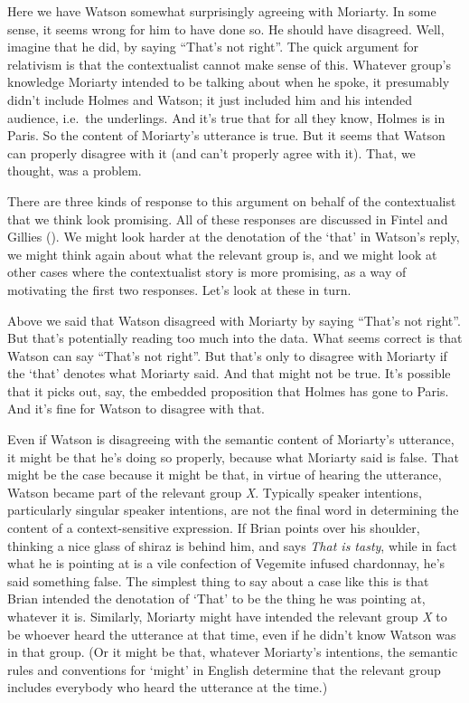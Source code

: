 \documentclass[
  11pt,
  letterpaper,
  DIV=11,
  numbers=noendperiod,
  twoside]{scrartcl}
\begin{document}
Here we have Watson somewhat surprisingly agreeing with Moriarty. In
some sense, it seems wrong for him to have done so. He should have
disagreed. Well, imagine that he did, by saying ``That's not right''.
The quick argument for relativism is that the contextualist cannot make
sense of this. Whatever group's knowledge Moriarty intended to be
talking about when he spoke, it presumably didn't include Holmes and
Watson; it just included him and his intended audience, i.e.~the
underlings. And it's true that for all they know, Holmes is in Paris. So
the content of Moriarty's utterance is true. But it seems that Watson
can properly disagree with it (and can't properly agree with it). That,
we thought, was a problem.

There are three kinds of response to this argument on behalf of the
contextualist that we think look promising. All of these responses are
discussed in Fintel and Gillies (). We
might look harder at the denotation of the `that' in Watson's reply, we
might think again about what the relevant group is, and we might look at
other cases where the contextualist story is more promising, as a way of
motivating the first two responses. Let's look at these in turn.

Above we said that Watson disagreed with Moriarty by saying ``That's not
right''. But that's potentially reading too much into the data. What
seems correct is that Watson can say ``That's not right''. But that's
only to disagree with Moriarty if the `that' denotes what Moriarty said.
And that might not be true. It's possible that it picks out, say, the
embedded proposition that Holmes has gone to Paris. And it's fine for
Watson to disagree with that.

Even if Watson is disagreeing with the semantic content of Moriarty's
utterance, it might be that he's doing so properly, because what
Moriarty said is false. That might be the case because it might be that,
in virtue of hearing the utterance, Watson became part of the relevant
group \emph{X}. Typically speaker intentions, particularly singular
speaker intentions, are not the final word in determining the content of
a context-sensitive expression. If Brian points over his shoulder,
thinking a nice glass of shiraz is behind him, and says \emph{That is
tasty}, while in fact what he is pointing at is a vile confection of
Vegemite infused chardonnay, he's said something false. The simplest
thing to say about a case like this is that Brian intended the
denotation of `That' to be the thing he was pointing at, whatever it is.
Similarly, Moriarty might have intended the relevant group \emph{X} to
be whoever heard the utterance at that time, even if he didn't know
Watson was in that group. (Or it might be that, whatever Moriarty's
intentions, the semantic rules and conventions for `might' in English
determine that the relevant group includes everybody who heard the
utterance at the time.)
\end{document}
